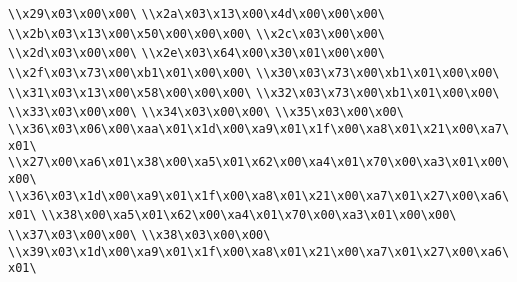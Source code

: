 \verb|\\x29\x03\x00\x00\|\newline
\verb|\\x2a\x03\x13\x00\x4d\x00\x00\x00\|\newline
\verb|\\x2b\x03\x13\x00\x50\x00\x00\x00\|\newline
\verb|\\x2c\x03\x00\x00\|\newline
\verb|\\x2d\x03\x00\x00\|\newline
\verb|\\x2e\x03\x64\x00\x30\x01\x00\x00\|\newline
\verb|\\x2f\x03\x73\x00\xb1\x01\x00\x00\|\newline
\verb|\\x30\x03\x73\x00\xb1\x01\x00\x00\|\newline
\verb|\\x31\x03\x13\x00\x58\x00\x00\x00\|\newline
\verb|\\x32\x03\x73\x00\xb1\x01\x00\x00\|\newline
\verb|\\x33\x03\x00\x00\|\newline
\verb|\\x34\x03\x00\x00\|\newline
\verb|\\x35\x03\x00\x00\|\newline
\verb|\\x36\x03\x06\x00\xaa\x01\x1d\x00\xa9\x01\x1f\x00\xa8\x01\x21\x00\xa7\x01\|\newline
\verb|\\x27\x00\xa6\x01\x38\x00\xa5\x01\x62\x00\xa4\x01\x70\x00\xa3\x01\x00\x00\|\newline
\verb|\\x36\x03\x1d\x00\xa9\x01\x1f\x00\xa8\x01\x21\x00\xa7\x01\x27\x00\xa6\x01\|\newline
\verb|\\x38\x00\xa5\x01\x62\x00\xa4\x01\x70\x00\xa3\x01\x00\x00\|\newline
\verb|\\x37\x03\x00\x00\|\newline
\verb|\\x38\x03\x00\x00\|\newline
\verb|\\x39\x03\x1d\x00\xa9\x01\x1f\x00\xa8\x01\x21\x00\xa7\x01\x27\x00\xa6\x01\|\newline
